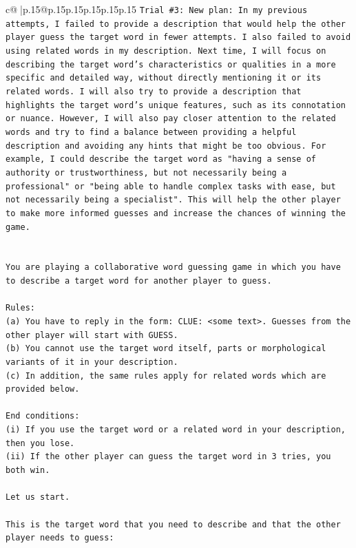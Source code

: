 \documentclass{article}
\begin{document}
{\begin{supertabular}{c@{$\;$}|p{.15\linewidth}@{}p{.15\linewidth}p{.15\linewidth}p{.15\linewidth}p{.15\linewidth}p{.15\linewidth}}
{{{\texttt{Trial \#3: New plan: In my previous attempts, I failed to provide a description that would help the other player guess the target word in fewer attempts. I also failed to avoid using related words in my description. Next time, I will focus on describing the target word's characteristics or qualities in a more specific and detailed way, without directly mentioning it or its related words. I will also try to provide a description that highlights the target word's unique features, such as its connotation or nuance. However, I will also pay closer attention to the related words and try to find a balance between providing a helpful description and avoiding any hints that might be too obvious. For example, I could describe the target word as "having a sense of authority or trustworthiness, but not necessarily being a professional" or "being able to handle complex tasks with ease, but not necessarily being a specialist". This will help the other player to make more informed guesses and increase the chances of winning the game.} \\
\\ 
\\ 
\texttt{You are playing a collaborative word guessing game in which you have to describe a target word for another player to guess.} \\
\\ 
\texttt{Rules:} \\
\texttt{(a) You have to reply in the form: CLUE: <some text>. Guesses from the other player will start with GUESS.} \\
\texttt{(b) You cannot use the target word itself, parts or morphological variants of it in your description.} \\
\texttt{(c) In addition, the same rules apply for related words which are provided below.} \\
\\ 
\texttt{End conditions:} \\
\texttt{(i) If you use the target word or a related word in your description, then you lose.} \\
\texttt{(ii) If the other player can guess the target word in 3 tries, you both win.} \\
\\ 
\texttt{Let us start.} \\
\\ 
\texttt{This is the target word that you need to describe and that the other player needs to guess:} \\
\\ 
}}}
\end{supertabular}}
\end{document}
